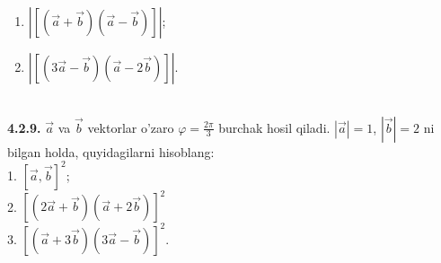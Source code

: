 \documentclass[10pt]{article}
\begin{document}
\begin{enumerate}
  \item $|[(\vec{a}+\vec{b})(\vec{a}-\vec{b})]|$;
  \item $|[(3 \vec{a}-\vec{b})(\vec{a}-2 \vec{b})]|$.
\end{enumerate}\\
\textbf{4.2.9.} $\vec{a}$ va $\vec{b}$ vektorlar o'zaro $\varphi=\frac{2 \pi}{3}$ burchak hosil qiladi. $|\vec{a}|=1$, $|\vec{b}|=2$ ni bilgan holda, quyidagilarni hisoblang:\\
1. $[\vec{a}, \vec{b}]^{2}$; \\
2. $[(2 \vec{a}+\vec{b})(\vec{a}+2 \vec{b})]^{2}$ \\
3. $[(\vec{a}+3 \vec{b})(3 \vec{a}-\vec{b})]^{2}$. \\
\end{document}
